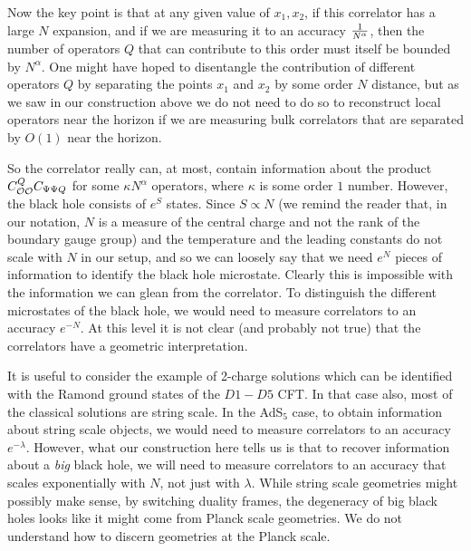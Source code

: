 Now the key point is that at any given value of $x_1, x_2$, if this correlator has a large $N$ expansion, and if we are measuring it to an accuracy ${1 \over N^{\alpha}}$, then the number of 
operators $Q$ that can contribute to this order must itself be bounded by $N^{\alpha}$. One might have hoped to disentangle the contribution of different operators $Q$ by separating the points $x_1$ and $x_2$ by some order $N$ distance, but as we saw in our construction above we do not need to do so to reconstruct local operators near the horizon if we are measuring bulk correlators that are separated by $O(1)$ near the horizon.

So the correlator really can, at most, contain information about the product $C_{{\cal O}{\cal O}}^Q C_{\Psi \Psi Q}$ for some $\kappa N^{\alpha}$ operators, where $\kappa$ is some  order $1$ number. However, the  black hole consists of $e^{S}$ states. Since $S \propto N$ (we remind the reader that, in our notation, $N$ is a measure of the central charge and not the rank of the boundary gauge group) and the temperature and the leading constants do not scale with $N$ in our setup, and so we can loosely say that we need $e^{N}$ pieces of information to identify the black hole microstate. Clearly this is impossible with the information we can glean from the correlator. To distinguish the different microstates of the black hole, we would need to measure correlators to an accuracy $e^{-N}$. At this level it is not clear (and probably not true) that the correlators have a geometric interpretation.


 It is useful to consider the example of 2-charge solutions \cite{Lunin:2001fv,Lunin:2002bj} which can be identified with the Ramond ground states
 of the  $D1-D5$ CFT. In that case also, most of the classical solutions are string scale. In the AdS$_5$ case, to obtain information about string scale objects, we would need to measure correlators to an accuracy $e^{-\lambda}$. However, what our construction here tells us is that to recover information about a {\it big} black hole, we will need to measure correlators to an accuracy that scales exponentially with $N$, not just with $\lambda$. While string scale geometries might possibly make sense, by switching duality frames, the degeneracy of big black holes looks like it might come from Planck scale geometries.  We do not understand how to discern geometries at the Planck scale.



